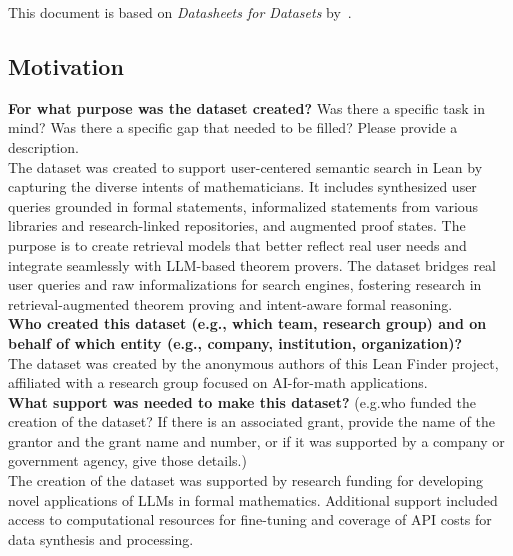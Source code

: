 
This document is based on \textit{Datasheets for Datasets} by~\citep{gebru2021datasheets}.

\subsection{Motivation}

    \textcolor{\sectioncolor}{\textbf{For what purpose was the dataset created?
    }
    Was there a specific task in mind? Was there
    a specific gap that needed to be filled? Please provide a description.
    } \\
The dataset was created to support user-centered semantic search in Lean by capturing the diverse intents of mathematicians. It includes synthesized user queries grounded in formal statements, informalized statements from various libraries and research-linked repositories, and augmented proof states. The purpose is to create retrieval models that better reflect real user needs and integrate seamlessly with LLM-based theorem provers. The dataset bridges real user queries and raw informalizations for search engines, fostering research in retrieval-augmented theorem proving and intent-aware formal reasoning.
    \\
    
    \textcolor{\sectioncolor}{\textbf{Who created this dataset (e.g., which team, research group) and on behalf
    of which entity (e.g., company, institution, organization)?
    }
    } \\
    The dataset was created by the anonymous authors of this Lean Finder project, affiliated with a research group focused on AI-for-math applications. \\
    
    \textcolor{\sectioncolor}{\textbf{What support was needed to make this dataset?
    }
    (e.g.who funded the creation of the dataset? If there is an associated
    grant, provide the name of the grantor and the grant name and number, or if
    it was supported by a company or government agency, give those details.)
    } \\
The creation of the dataset was supported by research funding for developing novel applications of LLMs in formal mathematics. Additional support included access to computational resources for fine-tuning and coverage of API costs for data synthesis and processing. \\
    

